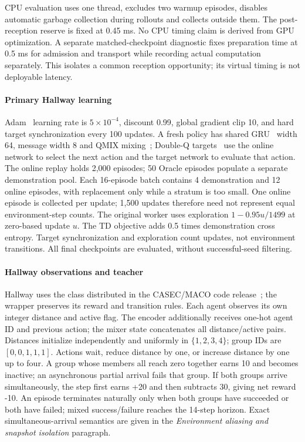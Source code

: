 \documentclass[10pt,a4paper]{article}
\begin{document}
CPU evaluation uses one thread, excludes two warmup episodes, disables automatic garbage collection during rollouts and collects outside them. The post-reception reserve is fixed at 0.45 ms. No CPU timing claim is derived from GPU optimization. A separate matched-checkpoint diagnostic fixes preparation time at 0.5 ms for admission and transport while recording actual computation separately. This isolates a common reception opportunity; its virtual timing is not deployable latency.
\paragraph{Primary Hallway learning} Adam~\citep{kingma2015adam} learning rate is $5\times10^{-4}$, discount 0.99, global gradient clip 10, and hard target synchronization every 100 updates. A fresh policy has shared GRU~\citep{cho2014learning} width 64, message width 8 and QMIX mixing~\citep{rashid2018qmix}; Double-Q targets~\citep{hasselt2016deepdouble} use the online network to select the next action and the target network to evaluate that action. The online replay holds 2,000 episodes; 50 Oracle episodes populate a separate demonstration pool. Each 16-episode batch contains 4 demonstration and 12 online episodes, with replacement only while a stratum is too small. One online episode is collected per update; 1,500 updates therefore need not represent equal environment-step counts. The original worker uses exploration $1-0.95u/1499$ at zero-based update $u$. The TD objective adds 0.5 times demonstration cross entropy. Target synchronization and exploration count updates, not environment transitions. All final checkpoints are evaluated, without successful-seed filtering.

\paragraph{Hallway observations and teacher}\label{app:local_clock} Hallway uses the class distributed in the CASEC/MACO code release~\citep{wang2022casec}; the wrapper preserves its reward and transition rules. Each agent observes its own integer distance and active flag. The encoder additionally receives one-hot agent ID and previous action; the mixer state concatenates all distance/active pairs. Distances initialize independently and uniformly in $\{1,2,3,4\}$; group IDs are $[0,0,1,1,1]$. Actions wait, reduce distance by one, or increase distance by one up to four. A group whose members all reach zero together earns 10 and becomes inactive; an asynchronous partial arrival fails that group. If both groups arrive simultaneously, the step first earns +20 and then subtracts 30, giving net reward -10. An episode terminates naturally only when both groups have succeeded or both have failed; mixed success/failure reaches the 14-step horizon. Exact simultaneous-arrival semantics are given in the \emph{Environment aliasing and snapshot isolation} paragraph.
\end{document}
